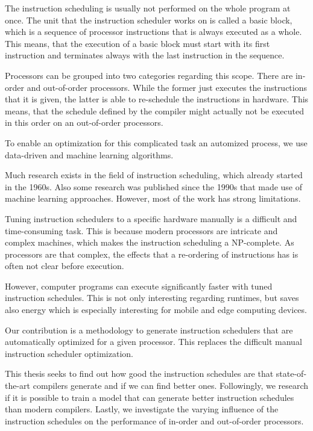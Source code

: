 The instruction scheduling is usually not performed on the whole program at once.
The unit that the instruction scheduler works on is called a basic block, which is a sequence of processor instructions that is always executed as a whole.
This means, that the execution of a basic block must start with its first instruction and terminates always with the last instruction in the sequence.

Processors can be grouped into two categories regarding this scope.
There are in-order and out-of-order processors.
While the former just executes the instructions that it is given, the latter is able to re-schedule the instructions in hardware.
This means, that the schedule defined by the compiler might actually not be executed in this order on an out-of-order processors.

To enable an optimization for this complicated task an automized process, we use data-driven and machine learning algorithms.

Much research exists in the field of instruction scheduling, which already started in the 1960s.
Also some research was published since the 1990s that made use of machine learning approaches.
However, most of the work has strong limitations.

Tuning instruction schedulers to a specific hardware manually is a difficult and time-consuming task.
This is because modern processors are intricate and complex machines, which makes the instruction scheduling a NP-complete.
As processors are that complex, the effects that a re-ordering of instructions has is often not clear before execution.

However, computer programs can execute significantly faster with tuned instruction schedules.
This is not only interesting regarding runtimes, but saves also energy which is especially interesting for mobile and edge computing devices.

Our contribution is a methodology to generate instruction schedulers that are automatically optimized for a given processor.
This replaces the difficult manual instruction scheduler optimization.

This thesis seeks to find out how good the instruction schedules are that state-of-the-art compilers generate and if we can find better ones.
Followingly, we research if it is possible to train a model that can generate better instruction schedules than modern compilers.
Lastly, we investigate the varying influence of the instruction schedules on the performance of in-order and out-of-order processors.

